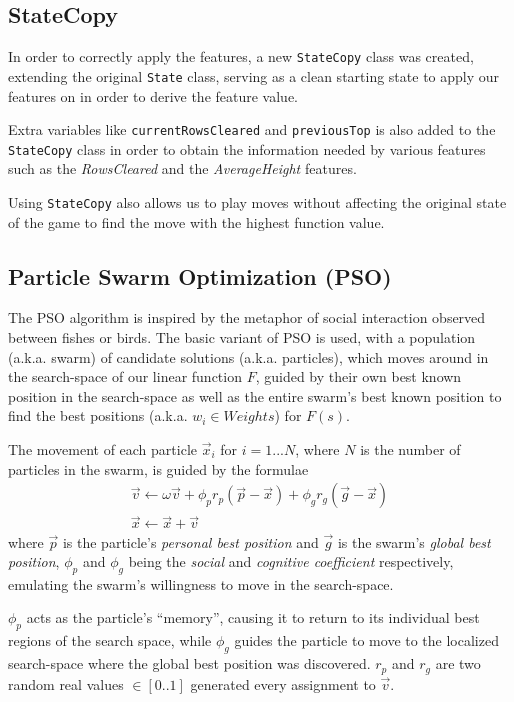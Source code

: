 \documentclass[12pt]{article}
\numberwithin{table}{section}
\begin{document}
\subsection{StateCopy} \label{statecopy}
In order to correctly apply the features, a new \texttt{StateCopy} class was created, extending the original \texttt{State} class, serving as a clean starting state to apply our features on in order to derive the feature value.

Extra variables like \texttt{currentRowsCleared} and \texttt{previousTop} is also added to the \texttt{StateCopy} class in order to obtain the information needed by various features such as the \emph{RowsCleared} and the \emph{AverageHeight} features.

Using \texttt{StateCopy} also allows us to play moves without affecting the original state of the game to find the move with the highest function value.

\subsection{Particle Swarm Optimization (PSO)} \label{PSO}
The PSO algorithm is inspired by the metaphor of social interaction observed between fishes or birds.
The basic variant of PSO is used, with a population (a.k.a. swarm) of candidate solutions (a.k.a. particles), which moves around in the search-space of our linear function $F$, guided by their own best known position in the search-space as well as the entire swarm's best known position to find the best positions (a.k.a. $w_i \in Weights$) for $F(s)$.

The movement of each particle $\vec{x}_i$ for $i=1...N$, where $N$ is the number of particles in the swarm, is guided by the formulae
\begin{gather*}
\vec{v}\leftarrow \omega\vec{v} + \phi_p r_p ( \vec{p} - \vec{x} ) + \phi_g r_g ( \vec{g} - \vec{x} )
\\
\vec{x}\leftarrow \vec{x} + \vec{v}
\end{gather*}
where $\vec{p}$ is the particle's \emph{personal best position} and $\vec{g}$ is the swarm's \emph{global best position}, $\phi_p$ and $\phi_g$ being the \emph{social} and \emph{cognitive coefficient} respectively, emulating the swarm's willingness to move in the search-space. 

$\phi_p$ acts as the particle's ``memory'', causing it to return to its individual best regions of the search space, while $\phi_g$ guides the particle to move to the localized search-space where the global best position was discovered. $r_p$ and $r_g$ are two random real values $\in\left[0..1\right]$ generated every assignment to $\vec{v}$. 
\end{document}
